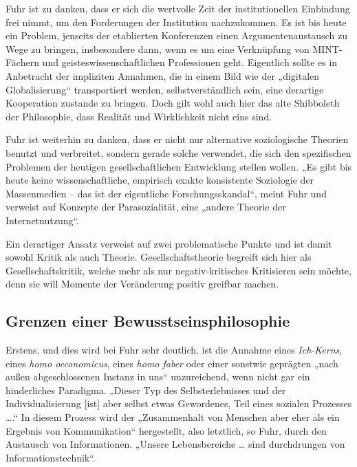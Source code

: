 \documentclass[a4paper,11pt]{article}
\begin{document}
Fuhr ist zu danken, dass er sich die wertvolle Zeit der institutionellen
Einbindung frei nimmt, um den Forderungen der Institution nachzukommen. Es ist
bis heute ein Problem, jenseits der etablierten Konferenzen einen
Argumentenaustausch zu Wege zu bringen, insbesondere dann, wenn es um eine
Verknüpfung von MINT-Fächern und geisteswissenschaftlichen Professionen geht.
Eigentlich sollte es in Anbetracht der impliziten Annahmen, die in einem Bild
wie der „digitalen Globalisierung“ transportiert werden, selbstverständlich
sein, eine derartige Kooperation zustande zu bringen. Doch gilt wohl auch hier
das alte Shibboleth der Philosophie, dass Realität und Wirklichkeit nicht eins
sind.

Fuhr ist weiterhin zu danken, dass er nicht nur alternative soziologische
Theorien benutzt und verbreitet, sondern gerade solche verwendet, die sich den
spezifischen Problemen der heutigen gesellschaftlichen Entwicklung stellen
wollen. „Es gibt bis heute keine wissenschaftliche, empirisch exakte
konsistente Soziologie der Massenmedien – das ist der eigentliche
Forschungsskandal“, meint Fuhr und verweist auf Konzepte der Parasozialität,
eine „andere Theorie der Internetnutzung“.

Ein derartiger Ansatz verweist auf zwei problematische Punkte und ist damit
sowohl Kritik als auch Theorie. Gesellschaftstheorie begreift sich hier als
Gesellschaftskritik, welche mehr als nur negativ-kritisches Kritisieren sein
möchte, denn sie will Momente der Veränderung positiv greifbar machen.

\subsection*{Grenzen einer Bewusstseinsphilosophie}

Erstens, und dies wird bei Fuhr sehr deutlich, ist die Annahme eines
\emph{Ich-Kerns}, eines \emph{homo oeconomicus}, eines \emph{homo faber} oder
einer sonstwie geprägten „nach außen abgeschlossenen Instanz in uns“
unzureichend, wenn nicht gar ein hinderliches Paradigma. „Dieser Typ des
Selbsterlebnisses und der Individualisierung [ist] aber selbst etwas
Gewordenes, Teil eines sozialen Prozesses {\ldots}.“ In diesem Prozess wird der
„Zusammenhalt von Menschen aber eher als ein Ergebnis von Kommunikation“
hergestellt, also letztlich, so Fuhr, durch den Austausch von
Informationen. „Unsere Lebensbereiche {\ldots} sind durchdrungen von
Informationstechnik“.
\end{document}
